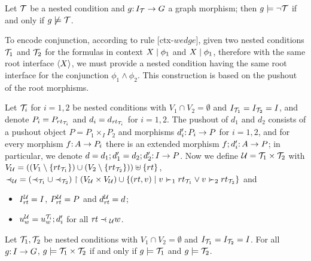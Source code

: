 \begin{proposition}
	\label{pr:negation satisfaction}
Let ${\mathcal{T}}$ be a {\proper} nested condition and $g{:}\, I_{\mathcal{T}}\rightarrow G$ a graph morphism; then $g\models \neg{\mathcal{T}}$ if and only if $g\not\models{\mathcal{T}}$.
\end{proposition}

To encode conjunction, according to rule [ctx-$wedge$], given two {\proper} nested conditions ${\mathcal{T}}_1$ and ${\mathcal{T}}_2$ for the formulas in context ${X} \mid {\phi_1}$ and ${X} \mid {\phi_1}$, therefore with the same root interface $\langle X\rangle$, we must provide a {\proper} nested condition having the same root interface for the conjunction $\phi_1 \wedge \phi_2$. This construction is based on the pushout of the root morphisms. 

Let ${\mathcal{T}}_i$ for $i=1,2$ be {\proper} nested conditions with $V_1\cap V_2= \emptyset $ and $I_{{\mathcal{T}}_1}=I_{{\mathcal{T}}_2}=I$, and denote $P_i=P_{rt_{{\mathcal{T}}_i}}$ and $d_i=d_{\mathit{rt}_{{\mathcal{T}}_i}}$ for $i=1,2$. The pushout of $d_1$ and $d_2$ consists of a pushout object $P=P_1\times_I P_2$ and morphisms $d'_i{:}\, P_i\rightarrow P$ for $i=1,2$, and for every morphism $f{:}\, A\rightarrow P_i$ there is an extended morphism $f;d'_i{:}\, A\rightarrow P$; in particular, we denote $d=d_1;d'_1=d_2;d'_2{:}\, I\rightarrow P$.  Now we define ${\mathcal{U}}={\mathcal{T}}_1\times {\mathcal{T}}_2$ with $V_{\mathcal{U}}=((V_1\setminus \{{rt_{{\mathcal{T}}_1}}\})\cup (V_2\setminus \{{rt_{{\mathcal{T}}_2}}\})) \uplus \{{rt}\}$, 
${\parentof}_{\cU}= ({\parentof}_{\cT_1}\cup {\parentof}_{\cT_2})\restr (V_\cU \times V_\cU) \cup \{(rt, v) \mid v \childof_1 rt_{\cT_1} \vee v \childof_2 rt_{\cT_2}\}$ and
%
\begin{itemize}
\item $I^{\mathcal{U}}_{\mathit{rt}}=I$, $P^{\mathcal{U}}_{\mathit{rt}}=P$ and $d^{\mathcal{U}}_{\mathit{rt}}=d$;
\item $u^{\mathcal{U}}_w=u^{{\mathcal{T}}_i}_w;d'_i$ for all $\rt \parentof_\cU w$.
\end{itemize}

\begin{proposition}
	\label{pr:and satisfaction}
Let ${\mathcal{T}}_1,{\mathcal{T}}_2$ be {\proper} nested conditions with  $V_1\cap V_2=\emptyset$ and $I_{{\mathcal{T}}_1}=I_{{\mathcal{T}}_2}=I$. For all $g{:}\, I\rightarrow G$, $g\models {\mathcal{T}}_1\times {\mathcal{T}}_2$ if and only if $g\models{\mathcal{T}}_1$ and $g\models {\mathcal{T}}_2$.
\end{proposition}
%

